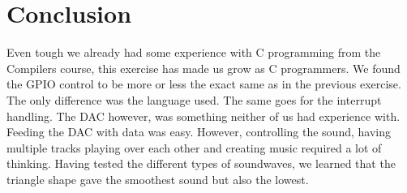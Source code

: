 \section{Conclusion}
Even tough we already had some experience with C programming from the Compilers course, this exercise has made us
grow as C programmers. We found the GPIO control to be more or less the exact same as in the previous exercise. The only difference was the language used. The same goes for the interrupt handling. The DAC however, was something neither of us had experience with. Feeding the DAC with data was easy. However, controlling the sound, having multiple tracks playing over each other and creating music required a lot of thinking. Having tested the different types of soundwaves, we learned that the triangle shape gave the smoothest sound but also the lowest. 
